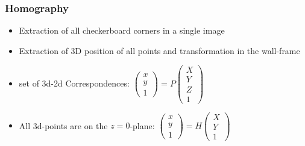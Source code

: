 \documentclass{beamer}
\begin{document}
\frame
{
\frametitle{Homography}
\begin{itemize}
\item Extraction of all checkerboard corners in a single image
\item Extraction of 3D position of all points and transformation in the wall-frame
\item set of 3d-2d Correspondences:
 $\left(\begin{array}{c}x \\y \\1\end{array}\right) = P \left(\begin{array}{c}X\\Y \\Z \\1\end{array}\right) $
 \item All 3d-points are on the $z=0$-plane: 
 $\left(\begin{array}{c}x \\y \\1\end{array}\right) = H \left(\begin{array}{c}X \\Y \\1\end{array}\right) $
\end{itemize}
}
\end{document}
